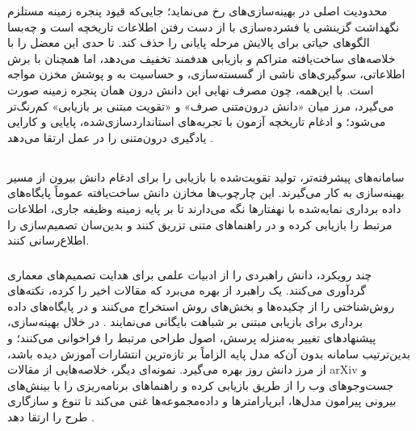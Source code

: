 محدودیت اصلی در بهینه‌سازی‌های  رخ می‌نماید؛ جایی‌که قیود پنجره زمینه مستلزم نگهداشت گزینشی یا فشرده‌سازی با از دست رفتن اطلاعات تاریخچه است و چه‌بسا الگوهای حیاتی برای پالایش مرحله پایانی را حذف کند.  تا حدی این معضل را با خلاصه‌های ساخت‌یافته متراکم و بازیابی هدفمند تخفیف می‌دهد، اما همچنان با برش اطلاعاتی، سوگیری‌های ناشی از گسسته‌سازی، و حساسیت به  و پوشش مخزن مواجه است. با این‌همه، چون مصرف نهایی این دانش درون همان پنجره زمینه صورت می‌گیرد، مرز میان «دانش درون‌متنی صرف» و «تقویت مبتنی بر بازیابی» کم‌رنگ‌تر می‌شود؛ و ادغام تاریخچه آزمون با تجربه‌های استانداردسازی‌شده، پایایی و کارایی یادگیری درون‌متنی را در عمل ارتقا می‌دهد \cite{zhang2023usingLLMforHPO, zheng2023GENIUS, chen2023Evoprompting, liu2024LLAMBO, zhang-etal-2024-MLCopilot}.

\subsection[دانش بیرونی: بازیابی از ادبیات و مخازن]{}

سامانه‌های پیشرفته‌تر، تولید تقویت‌شده با بازیابی را برای ادغام دانش بیرون از مسیر بهینه‌سازی به کار می‌گیرند. این چارچوب‌ها مخازن دانش ساخت‌یافته عموماً پایگاه‌های داده برداری نمایه‌شده با نهفتارها نگه می‌دارند تا بر پایه زمینه وظیفه جاری، اطلاعات مرتبط را بازیابی کرده و در راهنماهای متنی تزریق کنند و بدین‌سان تصمیم‌سازی را اطلاع‌رسانی کنند.

\subsubsection{\protect{}}

چند رویکرد، دانش راهبردی را از ادبیات علمی برای هدایت تصمیم‌های معماری گردآوری می‌کنند. یک راهبرد از  بهره می‌برد که مقالات اخیر را  کرده، نکته‌های روش‌شناختی را از چکیده‌ها و بخش‌های روش استخراج می‌کنند و در پایگاه‌های داده برداری برای بازیابی مبتنی بر شباهت بایگانی می‌نمایند \cite{Yang2025NADER}. در خلال بهینه‌سازی، پیشنهادهای تغییر به‌منزله پرسش، اصول طراحی مرتبط را فراخوانی می‌کنند؛ و بدین‌ترتیب سامانه بدون آن‌که مدل پایه الزاماً بر تازه‌ترین انتشارات آموزش دیده باشد، از مرز دانش روز بهره می‌گیرد. نمونه‌ای دیگر، خلاصه‌هایی از مقالات arXiv و جست‌وجوهای وب را از طریق  بازیابی کرده و راهنماهای برنامه‌ریزی را با بینش‌های بیرونی پیرامون مدل‌ها، ابرپارامترها و داده‌مجموعه‌ها غنی می‌کند تا تنوع و سازگاری طرح را ارتقا دهد \cite{trirat2025automlagent}.

